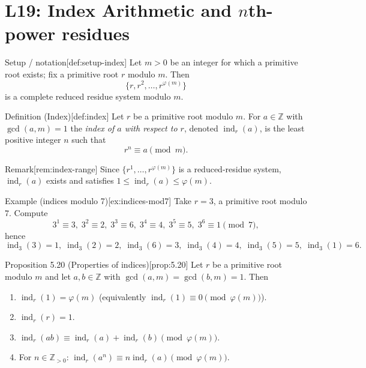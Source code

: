 \documentclass[10pt]{article}
\theoremstyle{definition}
\theoremstyle{plain}
\numberwithin{equation}{section}
\begin{document}
\section*{L19: Index Arithmetic and \(n\)th-power residues}

\begin{define}{Setup / notation}[def:setup-index]
Let \(m>0\) be an integer for which a primitive root exists; fix a primitive root \(r\) modulo \(m\). Then
\[
\{r, r^2, \dots, r^{\varphi(m)}\}
\]
is a complete reduced residue system modulo \(m\).
\end{define}

\begin{define}{Definition (Index)}[def:index]
Let \(r\) be a primitive root modulo \(m\). For \(a\in\mathbb{Z}\) with \(\gcd(a,m)=1\) the \emph{index of \(a\) with respect to \(r\)}, denoted \(\operatorname{ind}_r(a)\), is the least positive integer \(n\) such that
\[
r^n\equiv a\pmod m.
\]
\end{define}

\begin{define}{Remark}[rem:index-range]
Since \(\{r^1,\dots,r^{\varphi(m)}\}\) is a reduced-residue system, \(\operatorname{ind}_r(a)\) exists and satisfies \(1\le \operatorname{ind}_r(a)\le\varphi(m)\).
\end{define}

\begin{define}{Example (indices modulo 7)}[ex:indices-mod7]
Take \(r=3\), a primitive root modulo \(7\). Compute
\[
3^1\equiv3,\;3^2\equiv2,\;3^3\equiv6,\;3^4\equiv4,\;3^5\equiv5,\;3^6\equiv1\pmod7,
\]
hence
\[
\operatorname{ind}_3(3)=1,\;\operatorname{ind}_3(2)=2,\;\operatorname{ind}_3(6)=3,\;
\operatorname{ind}_3(4)=4,\;\operatorname{ind}_3(5)=5,\;\operatorname{ind}_3(1)=6.
\]
\end{define}

\bigskip

\begin{define}{Proposition 5.20 (Properties of indices)}[prop:5.20]
Let \(r\) be a primitive root modulo \(m\) and let \(a,b\in\mathbb{Z}\) with \(\gcd(a,m)=\gcd(b,m)=1\). Then
\begin{enumerate}
  \item \(\operatorname{ind}_r(1)=\varphi(m)\) (equivalently \(\operatorname{ind}_r(1)\equiv 0\pmod{\varphi(m)}\)).
  \item \(\operatorname{ind}_r(r)=1\).
  \item \(\operatorname{ind}_r(ab)\equiv \operatorname{ind}_r(a)+\operatorname{ind}_r(b)\pmod{\varphi(m)}\).
  \item For \(n\in\mathbb{Z}_{>0}\): \(\operatorname{ind}_r(a^n)\equiv n\operatorname{ind}_r(a)\pmod{\varphi(m)}\).
\end{enumerate}
\end{define}
\end{document}
